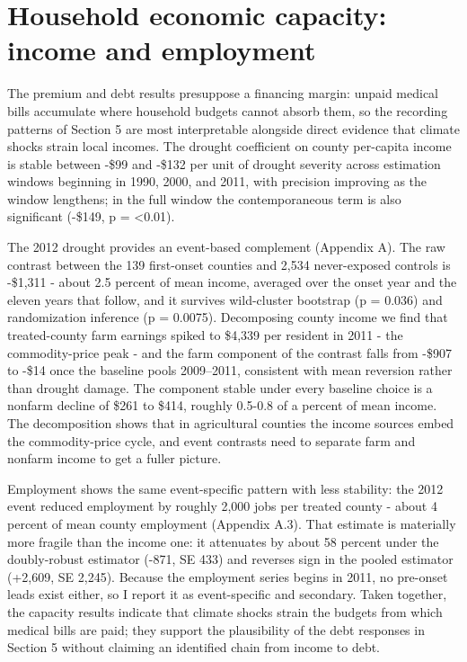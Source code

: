 \documentclass[a4paper,11pt]{report}
\begin{document}
\FloatBarrier
\section{Household economic capacity: income and employment}

The premium and debt results presuppose a financing margin: unpaid medical bills accumulate where household budgets cannot absorb them, so the recording patterns of Section 5 are most interpretable alongside direct evidence that climate shocks strain local incomes. The drought coefficient on county per-capita income is stable between -\$99 and -\$132 per unit of drought severity across estimation windows beginning in 1990, 2000, and 2011, with precision improving as the window lengthens; in the full window the contemporaneous term is also significant (-\$149, p = <0.01).

The 2012 drought provides an event-based complement (Appendix A). The raw contrast between the 139 first-onset counties and 2,534 never-exposed controls is -\$1,311 - about 2.5 percent of mean income, averaged over the onset year and the eleven years that follow, and it survives wild-cluster bootstrap (p = 0.036) and randomization inference (p = 0.0075). Decomposing county income we find that treated-county farm earnings spiked to \$4,339 per resident in 2011 - the commodity-price peak - and the farm component of the contrast falls from -\$907 to -\$14 once the baseline pools 2009--2011, consistent with mean reversion rather than drought damage. The component stable under every baseline choice is a nonfarm decline of \$261 to \$414, roughly 0.5-0.8 of a percent of mean income. The decomposition shows that in agricultural counties the income sources embed the commodity-price cycle, and event contrasts need to separate farm and nonfarm income to get a fuller picture.

Employment shows the same event-specific pattern with less stability: the 2012 event reduced employment by roughly 2,000 jobs per treated county - about 4 percent of mean county employment (Appendix A.3). That estimate is materially more fragile than the income one: it attenuates by about 58 percent under the doubly-robust estimator (-871, SE 433) and reverses sign in the pooled estimator (+2,609, SE 2,245). Because the employment series begins in 2011, no pre-onset leads exist either, so I report it as event-specific and secondary. Taken together, the capacity results indicate that climate shocks strain the budgets from which medical bills are paid; they support the plausibility of the debt responses in Section 5 without claiming an identified chain from income to debt.
\end{document}
